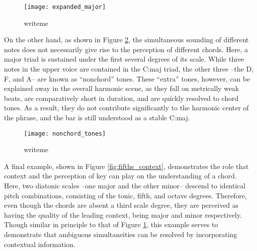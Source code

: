 \begin{figure}[t]
\centering
\texttt{[image: expanded\_major]}
\caption{writeme}
\label{fig:expanded_major}
\end{figure}

On the other hand, as shown in Figure \ref{fig:nonchord_tones}, the simultaneous sounding of different notes does not necessarily give rise to the perception of different chords.
Here, a major triad is sustained under the first several degrees of its scale.
While three notes in the upper voice are contained in the C:maj triad, the other three --the D, F, and A-- are known as ``nonchord'' tones.
These ``extra'' tones, however, can be explained away in the overall harmonic scene, as they fall on metrically weak beats, are comparatively short in duration, and are quickly resolved to chord tones.
As a result, they do not contribute significantly to the harmonic center of the phrase, and the bar is still understood as a stable C:maj.


\begin{figure}[t]
\centering
\texttt{[image: nonchord\_tones]}
\caption{writeme}
\label{fig:nonchord_tones}
\end{figure}

A final example, shown in Figure \ref{fig:fifths_context}, demonstrates the role that context and the perception of key can play on the understanding of a chord.
Here, two diatonic scales --one major and the other minor-- descend to identical pitch combinations, consisting of the tonic, fifth, and octave degrees.
Therefore, even though the chords are absent a third scale degree, they are perceived as having the quality of the leading context, being major and minor respectively.
Though similar in principle to that of Figure \ref{fig:expanded_major}, this example serves to demonstrate that ambiguous simultaneities can be resolved by incorporating contextual information.


